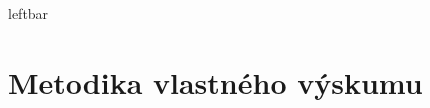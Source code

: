 %

\ifcsname leftbar\endcsname
  \newenvironment{aibar}{\begin{leftbar}}{\end{leftbar}}
\else
  \newenvironment{aibar}{\par\noindent\ignorespaces}{\par}
\fi

\chapter{Metodika vlastného výskumu}
\label{chapter:methodology}

